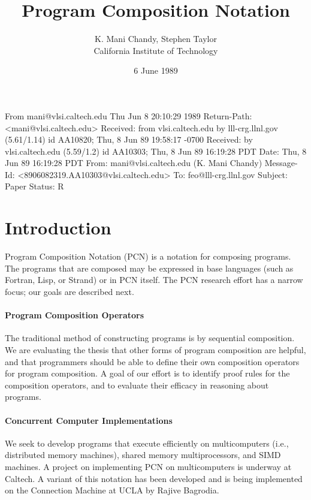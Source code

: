 From mani@vlsi.caltech.edu Thu Jun  8 20:10:29 1989
Return-Path: <mani@vlsi.caltech.edu>
Received: from vlsi.caltech.edu by lll-crg.llnl.gov (5.61/1.14)
	id AA10820; Thu, 8 Jun 89 19:58:17 -0700
Received: by vlsi.caltech.edu (5.59/1.2)
	id AA10303; Thu, 8 Jun 89 16:19:28 PDT
Date: Thu, 8 Jun 89 16:19:28 PDT
From: mani@vlsi.caltech.edu (K. Mani Chandy)
Message-Id: <8906082319.AA10303@vlsi.caltech.edu>
To: feo@lll-crg.llnl.gov
Subject:  Paper
Status: R


\title{Program Composition Notation}
 \author{K. Mani Chandy, Stephen Taylor\\
       California Institute of Technology\\
       }
 \date{6 June 1989}

 
 \maketitle
\section{Introduction}
Program Composition Notation (PCN) is a 
notation for composing programs.
The programs that are composed may be expressed in base languages (such as
Fortran, Lisp, or Strand) or in PCN itself.
The PCN research effort has a narrow focus; our goals are described next.

\paragraph{Program Composition Operators}
The traditional method of constructing programs is by sequential composition.
We are evaluating the thesis that other forms of program composition are
helpful, and that programmers should be able to define their own composition
operators for program composition. 
A goal of our effort is to identify proof rules for the 
composition operators, and to evaluate their efficacy in reasoning about
programs.
 
\paragraph{Concurrent Computer Implementations}
We seek to develop programs that execute efficiently on 
multicomputers (i.e., distributed
memory machines), shared memory multiprocessors, and SIMD machines.
A project on implementing PCN on multicomputers is underway at Caltech.
A variant of this notation has been developed and
is being implemented on the Connection
Machine at UCLA by Rajive Bagrodia.

